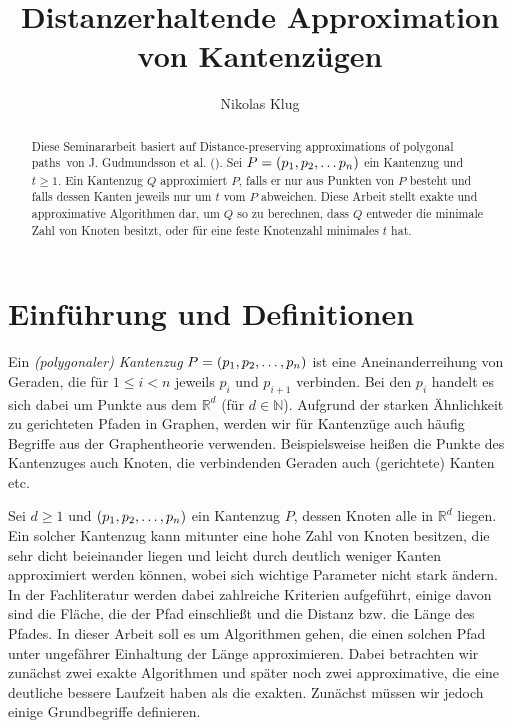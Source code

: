 \documentclass[11pt]{article}
\title{Distanzerhaltende Approximation von Kantenzügen}
\author{Nikolas Klug}
\newcommand{\R}{\mathbb{R}}
\begin{document}
    \maketitle

    \begin{abstract}
        Diese Seminararbeit basiert auf \glqq Distance-preserving approximations of polygonal paths\grqq\ von J. Gudmundsson et al. (\cite{gudmundsson}). Sei $P = (p_1, p_2, \mathellipsis p_n)$ ein Kantenzug und $t \geq 1$. Ein Kantenzug $Q$ approximiert $P$, falls er nur aus Punkten von $P$ besteht und falls dessen Kanten jeweils nur um $t$ vom $P$ abweichen. Diese Arbeit stellt exakte und approximative Algorithmen dar, um $Q$ so zu berechnen, dass $Q$ entweder die minimale Zahl von Knoten besitzt, oder für eine feste Knotenzahl minimales $t$ hat.
    \end{abstract}

    \section{Einführung und Definitionen}
    \label{sec:intro}

	Ein \emph{(polygonaler) Kantenzug} $P = (p_1, p_2, \mathellipsis, p_n)$ ist eine Aneinanderreihung von Geraden, die für $1 \leq i < n$ jeweils $p_i$ und $p_{i+1}$ verbinden. Bei den $p_i$ handelt es sich dabei um Punkte aus dem $\R^d$ (für $d \in \mathbb{N}$). Aufgrund der starken Ähnlichkeit zu gerichteten Pfaden in Graphen, werden wir für Kantenzüge auch häufig Begriffe aus der Graphentheorie verwenden. Beispielsweise heißen die Punkte des Kantenzuges  auch Knoten, die verbindenden Geraden auch (gerichtete) Kanten etc.

    Sei $d\geq1$ und $(p_1, p_2, \mathellipsis, p_n)$ ein Kantenzug $P$, dessen Knoten alle in $\R^{d}$ liegen.
    Ein solcher Kantenzug kann mitunter eine hohe Zahl von Knoten besitzen, die sehr dicht beieinander liegen und leicht durch deutlich weniger Kanten approximiert werden können, wobei sich wichtige Parameter nicht stark ändern. In der Fachliteratur werden dabei zahlreiche Kriterien aufgeführt, einige davon sind die Fläche, die der Pfad einschließt und die Distanz bzw. die Länge des Pfades. In dieser Arbeit soll es um Algorithmen gehen, die einen solchen Pfad unter ungefährer Einhaltung der Länge approximieren. Dabei betrachten wir zunächst zwei exakte Algorithmen und später noch zwei approximative, die eine deutliche bessere Laufzeit haben als die exakten. Zunächst müssen wir jedoch einige Grundbegriffe definieren.
   
\end{document}
